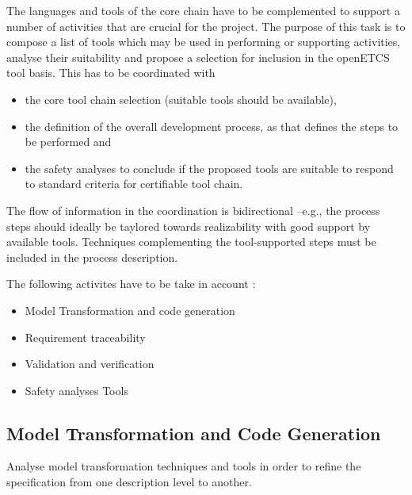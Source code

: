 \documentclass{template/openetcs_article}
\begin{document}
The languages and tools  of the core chain have to be complemented to support a number of activities that are crucial for the project. The purpose of this task is to compose a list of tools which may be
used in performing or supporting  activities, analyse their
suitability and propose a selection for inclusion in the openETCS tool
basis. This has to be coordinated with 
\begin{itemize}
\item the core tool chain selection (suitable  tools should be
  available), 
\item the definition of the overall development process, as that defines the steps to be performed and 
\item the safety analyses to  conclude if the proposed tools are suitable to  respond to standard criteria for certifiable tool chain.
\end{itemize}
  The flow of information in the coordination is bidirectional --e.g., the process
steps should ideally be taylored towards realizability with good
support by available tools. Techniques complementing the
tool-supported steps must be included in the process description. 
  
The following activites have to be take in account :
\begin{itemize}
\item Model Transformation and code generation 
\item Requirement traceability
\item Validation and verification
\item Safety analyses Tools
\end{itemize}


\subsection{Model Transformation and Code Generation}

Analyse model transformation techniques and tools in order to refine the specification from one description level to another.

\end{document}
